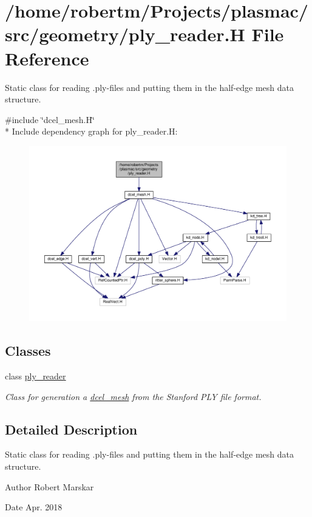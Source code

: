\hypertarget{ply__reader_8H}{}\section{/home/robertm/\+Projects/plasmac/src/geometry/ply\+\_\+reader.H File Reference}
\label{ply__reader_8H}


Static class for reading .ply-\/files and putting them in the half-\/edge mesh data structure.  


{\ttfamily \#include \char`\"{}dcel\+\_\+mesh.\+H\char`\"{}}\\*
Include dependency graph for ply\+\_\+reader.\+H\+:\nopagebreak
\begin{figure}[H]
\begin{center}
\leavevmode
\includegraphics[width=350pt]{ply__reader_8H__incl}
\end{center}
\end{figure}
\subsection*{Classes}
\begin{DoxyCompactItemize}
\item 
class \hyperlink{classply__reader}{ply\+\_\+reader}
\begin{DoxyCompactList}\small\item\em Class for generation a \hyperlink{classdcel__mesh}{dcel\+\_\+mesh} from the Stanford P\+LY file format. \end{DoxyCompactList}\end{DoxyCompactItemize}


\subsection{Detailed Description}
Static class for reading .ply-\/files and putting them in the half-\/edge mesh data structure. 

\begin{DoxyAuthor}{Author}
Robert Marskar 
\end{DoxyAuthor}
\begin{DoxyDate}{Date}
Apr. 2018 
\end{DoxyDate}

